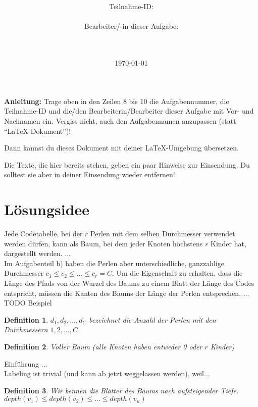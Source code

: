 \documentclass[a4paper,10pt,ngerman]{scrartcl}
\title{\textbf{\Huge\Aufgabe}}
\author{\LARGE Teilnahme-ID: \LARGE \TeilnahmeId \\\\
	    \LARGE Bearbeiter/-in dieser Aufgabe: \\ 
	    \LARGE \Name\\\\}
\date{\LARGE\today}
\newtheorem{definition}{Definition}
\begin{document}
\maketitle
\tableofcontents

\vspace{0.5cm}

\textbf{Anleitung:} Trage oben in den Zeilen 8 bis 10 die Aufgabennummer, die Teilnahme-ID und die/den Bearbeiterin/Bearbeiter dieser Aufgabe mit Vor- und Nachnamen ein.
Vergiss nicht, auch den Aufgabennamen anzupassen (statt "`\LaTeX-Dokument"')!

Dann kannst du dieses Dokument mit deiner \LaTeX-Umgebung übersetzen.

Die Texte, die hier bereits stehen, geben ein paar Hinweise zur
Einsendung. Du solltest sie aber in deiner Einsendung wieder entfernen!

\section{Lösungsidee}
Jede Codetabelle, bei der $r$ Perlen mit dem selben Durchmesser verwendet werden dürfen, kann als Baum, bei dem jeder Knoten höchstens $r$ Kinder hat, dargestellt werden. ... \\

Im Aufgabenteil b) haben die Perlen aber unterschiedliche, ganzzahlige Durchmesser $c_1 \le c_2 \le \dots \le c_r = C$. Um die Eigenschaft zu erhalten, dass die Länge des Pfads von der Wurzel des Baums zu einem Blatt der Länge des Codes entspricht, müssen die Kanten des Baums der Länge der Perlen entsprechen. ... \\
TODO Beispiel \\

\begin{definition}
    $d_1, d_2, \dots, d_C$ bezeichnet die Anzahl der Perlen mit den Durchmessern $1, 2, \dots, C$.
\end{definition}

\begin{definition}
    Voller Baum (alle Knoten haben entweder 0 oder $r$ Kinder) \\
\end{definition}



Einführung ... \\
Labeling ist trivial (und kann ab jetzt weggelassen werden), weil... \\
\begin{definition}
    Wir bennen die Blätter des Baums nach aufsteigender Tiefe:
    $depth(v_1) \le depth(v_2) \le \dots \le depth(v_n)$
\end{definition}
\end{document}
